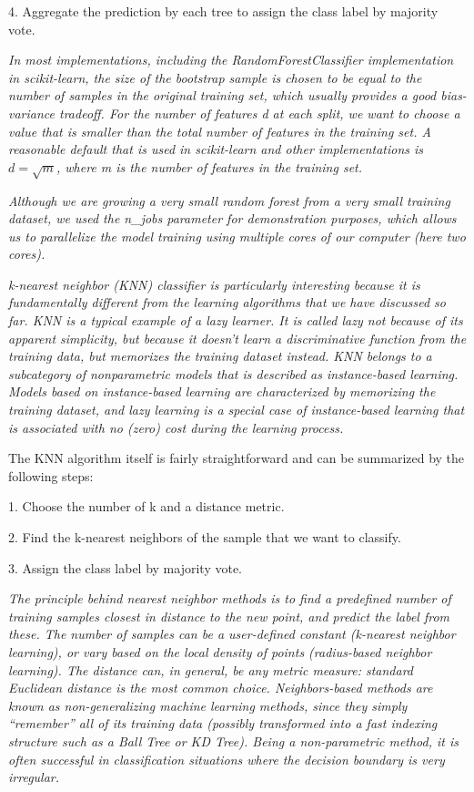 4. Aggregate the prediction by each tree to assign the class label by majority vote.

\textit{In most implementations, including the RandomForestClassifier implementation in scikit-learn, the size of the bootstrap sample is chosen to be equal to the number of samples in the original training set, which usually provides a good bias-variance tradeoff. For the number of features d at each split, we want to choose a value that is smaller than the total number of features in the training set. A reasonable default that is used in scikit-learn and other implementations is $d=\sqrt{m}$, where m is the number of features in the training set.}

\textit{Although we are growing a very small random forest from a very small training dataset, we used the n\_jobs parameter for demonstration purposes, which allows us to parallelize the model training using multiple cores of our computer (here two cores).}

\textit{k-nearest neighbor (KNN) classifier is particularly interesting because it is fundamentally different from the learning algorithms that we have discussed so far.  KNN is a typical example of a lazy learner. It is called lazy not because of its apparent simplicity, but because it doesn't learn a discriminative function from the training data, but memorizes the training dataset instead. KNN belongs to a subcategory of nonparametric models that is described as instance-based learning. Models based on instance-based learning are characterized by memorizing the training dataset, and lazy learning is a special case of instance-based learning that is associated with no (zero) cost during the learning process.}

The KNN algorithm itself is fairly straightforward and can be summarized by the following steps:

1. Choose the number of k and a distance metric.

2. Find the k-nearest neighbors of the sample that we want to classify.

3. Assign the class label by majority vote.

\textit{The principle behind nearest neighbor methods is to find a predefined number of training samples closest in distance to the new point, and predict the label from these. The number of samples can be a user-defined constant (k-nearest neighbor learning), or vary based on the local density of points (radius-based neighbor learning). The distance can, in general, be any metric measure: standard Euclidean distance is the most common choice. Neighbors-based methods are known as non-generalizing machine learning methods, since they simply “remember” all of its training data (possibly transformed into a fast indexing structure such as a Ball Tree or KD Tree). Being a non-parametric method, it is often successful in classification situations where the decision boundary is very irregular.}\cite{Scikit-learndevelopers2019c}

